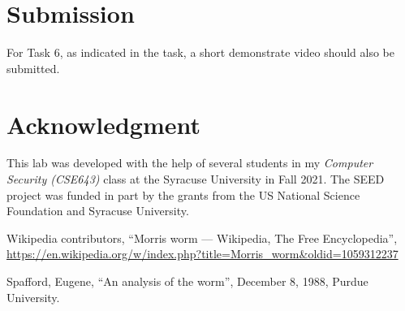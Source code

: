 \section{Submission}


For Task 6, as indicated in the task, 
a short demonstrate video should also be submitted.



\section*{Acknowledgment} 

This lab was developed with the help of several students 
in my \textit{Computer Security (CSE643)} class 
at the Syracuse University in Fall 2021. 
The SEED project was funded in part 
by the grants from the US National Science Foundation
and Syracuse University.


\begin{thebibliography}{90}

Wikipedia contributors, ``Morris worm --- Wikipedia, The Free Encyclopedia'', 
\url{https://en.wikipedia.org/w/index.php?title=Morris_worm&oldid=1059312237}

Spafford, Eugene, ``An analysis of the worm'', December 8, 1988, Purdue University. 
\end{thebibliography}




